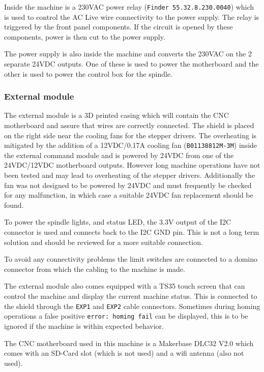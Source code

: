 \documentclass[11pt, openright]{book}
\begin{document}
        Inside the machine is a 230VAC power relay (\texttt{Finder 55.32.8.230.0040}) which is used to control the AC Live wire connectivity to the power supply. The relay is triggered by the front panel components. If the circuit  is opened by these components, power is then cut to the power supply. 

        The power supply is also inside the machine and converts the 230VAC on the 2 separate 24VDC outputs. One of these is used to power the motherboard and the other is used to power the control box for the spindle. 
        
         \subsubsection{External module}

         The external module is a 3D printed casing which will contain the CNC motherboard and assure that wires are correctly connected. The shield is placed on the right side near the cooling fans for the stepper drivers. The overheating is mitigated by the addition of a 12VDC/0.17A cooling fan (\texttt{B01138812M-3M}) inside the external command module and is powered by 24VDC from one of the 24VDC/12VDC motherboard outputs. However long machine operations have not been tested and may lead to overheating of the stepper drivers. Additionally the fan was not designed to be powered by 24VDC and must frequently be checked for any malfunction, in which case a suitable 24VDC fan replacement should be found.

         To power the spindle lights, and status LED, the 3.3V output of the I2C connector is used and connects back to the I2C GND pin. This is not a long term solution and should be reviewed for a more suitable connection. 
        
         To avoid any connectivity problems the limit switches are connected to a domino connector from which the cabling to the machine is made. 

         The external module also comes equipped with a TS35 touch screen that can control the machine and display the current machine status. This is connected to the shield through the \texttt{EXP1} and \texttt{EXP2} cable connectors. Sometimes during homing operations a false positive \texttt{error: homing fail} can be displayed, this is to be ignored if the machine is within expected behavior. 

         The CNC motherboard used in this machine is a Makerbase DLC32 V2.0 which comes with an SD-Card slot (which is not used) and a wifi antenna (also not used).  
         
\end{document}

